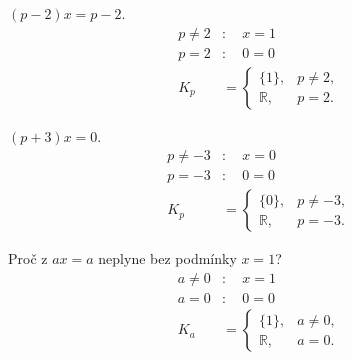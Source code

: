 \documentclass[11pt,a4paper]{article}
\begin{document}
\begin{zadaniReseniBox}[title={Samostatná práce 2}]
$(p-2)x=p-2$.
\tcblower
\[\begin{aligned}
p\ne2&:\quad x=1 \\
p=2&:\quad0=0 \\
K_p&=\begin{cases}\{1\},&p\ne2,\\\mathbb R,&p=2.\end{cases}
\end{aligned}\]

\end{zadaniReseniBox}
\begin{zadaniReseniBox}[title={Samostatná práce 3}]
$(p+3)x=0$.
\tcblower
\[\begin{aligned}
p\ne-3&:\quad x=0 \\
p=-3&:\quad0=0 \\
K_p&=\begin{cases}\{0\},&p\ne-3,\\\mathbb R,&p=-3.\end{cases}
\end{aligned}\]

\end{zadaniReseniBox}
\begin{zadaniReseniBox}[title={Rozšíření 1}]
Proč z $ax=a$ neplyne bez podmínky $x=1$?
\tcblower
\[\begin{aligned}
a\ne0&:\quad x=1 \\
a=0&:\quad 0=0 \\
K_a&=\begin{cases}\{1\},&a\ne0,\\\mathbb R,&a=0.\end{cases}
\end{aligned}\]

\end{zadaniReseniBox}
\end{document}
